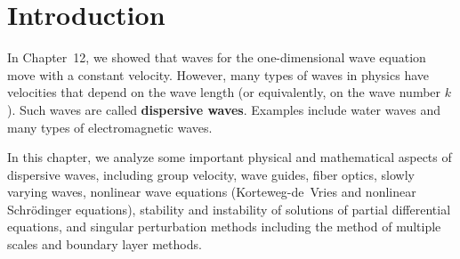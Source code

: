 \section{Introduction}
\label{sec:dispersive-intro}

In Chapter~12, we showed that waves for the one-dimensional wave equation move with a constant velocity.  However, many types of waves in physics have velocities that depend on the wave length (or equivalently, on the wave number $k$).  Such waves are called \textbf{dispersive waves}.  Examples include water waves and many types of electromagnetic waves.

In this chapter, we analyze some important physical and mathematical aspects of dispersive waves, including group velocity, wave guides, fiber optics, slowly varying waves, nonlinear wave equations (Korteweg-de~Vries and nonlinear Schr\"odinger equations), stability and instability of solutions of partial differential equations, and singular perturbation methods including the method of multiple scales and boundary layer methods.
